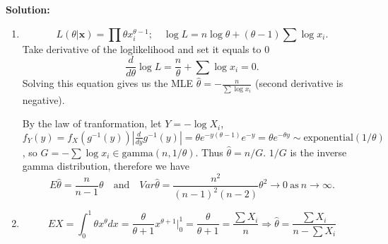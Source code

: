 \documentclass[11pt]{article}
\newcommand{\x}{\mathbf{x}}
\newcommand{\Sol}{\par {\bf Solution:}}
\begin{document}
\Sol
\begin{enumerate}[label=(\alph*)]
    \item
    \[
    L(\theta|\x) = \prod \theta x_i^{\theta - 1}; \quad \log L = n\log \theta + (\theta - 1) \sum \log x_i.
    \]
    Take derivative of the loglikelihood and set it equals to 0
    \[
    \frac{d}{d\theta}\log L = \frac{n}{\theta} + \sum \log x_i = 0.
    \]
    Solving this equation gives us the MLE $\hat{\theta} = - \frac{n}{\sum \log x_i}$ (second derivative is negative).

    By the law of tranformation, let $Y = - \log X_i$, $f_Y(y) = f_X(g^{-1}(y))|\frac{d}{dy}g^{-1}(y)| = \theta e^{-y(\theta - 1)}e^{-y} = \theta e^{-\theta y} \sim \text{exponential}(1/\theta)$, so $G = -\sum \log x_i \in \text{gamma}(n, 1/\theta).$ Thus $\hat \theta = n/G$.
    $1/G$ is the inverse gamma distribution, therefore we have
    \[
    E\hat{\theta} = \frac{n}{n-1}\theta \quad \text{and} \quad Var\hat{\theta} = \frac{n^2}{(n-1)^2(n-2)}\theta^2 \to 0 ~\text{as} ~n\to \infty.
    \]
    \item
    \[
    EX = \int_0^1 \theta x^\theta dx = \frac{\theta}{\theta + 1}x^{\theta + 1}\Biggr|_0^1 = \frac{\theta}{\theta + 1} = \frac{\sum X_i}{n} \Longrightarrow \hat{\theta} = \frac{\sum X_i}{n - \sum X_i}
    \]
\end{enumerate}
\end{document}
